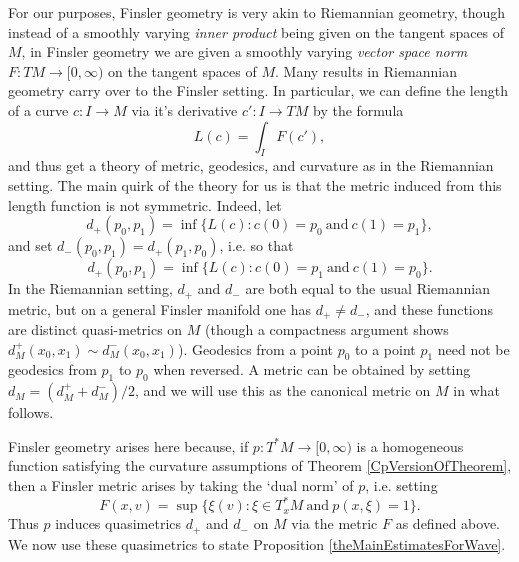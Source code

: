 For our purposes, Finsler geometry is very akin to Riemannian geometry, though instead of a smoothly varying \emph{inner product} being given on the tangent spaces of $M$, in Finsler geometry we are given a smoothly varying \emph{vector space norm} $F: TM \to [0,\infty)$ on the tangent spaces of $M$. Many results in Riemannian geometry carry over to the Finsler setting. In particular, we can define the length of a curve $c: I \to M$ via it's derivative $c': I \to TM$ by the formula
%
\begin{equation}
    L(c) = \int_I F(c'),
\end{equation}
%
and thus get a theory of metric, geodesics, and curvature as in the Riemannian setting. The main quirk of the theory for us is that the metric induced from this length function is not symmetric. Indeed, let
%
\begin{equation}
    d_+(p_0,p_1) = \inf \big\{ L(c) : c(0) = p_0\ \text{and}\ c(1) = p_1 \big\},
\end{equation}
%
and set $d_-(p_0,p_1) = d_+(p_1,p_0)$, i.e. so that
%
\begin{equation}
    d_+(p_0,p_1) = \inf \big\{ L(c) : c(0) = p_1\ \text{and}\ c(1) = p_0 \big\}.
\end{equation}
%
In the Riemannian setting, $d_+$ and $d_-$ are both equal to the usual Riemannian metric, but on a general Finsler manifold one has $d_+ \neq d_-$, and these functions are distinct quasi-metrics on $M$ (though a compactness argument shows $d_M^+(x_0,x_1) \sim d_M^-(x_0,x_1)$). Geodesics from a point $p_0$ to a point $p_1$ need not be geodesics from $p_1$ to $p_0$ when reversed. A metric can be obtained by setting $d_M = (d_M^+ + d_M^-) / 2$, and we will use this as the canonical metric on $M$ in what follows.

Finsler geometry arises here because, if $p: T^* M \to [0,\infty)$ is a homogeneous function satisfying the curvature assumptions of Theorem \ref{CpVersionOfTheorem}, then a Finsler metric arises by taking the `dual norm' of $p$, i.e. setting
%
\begin{equation}
    F(x,v) = \sup \big\{ \xi(v) : \xi \in T^*_x M\ \text{and}\ p(x,\xi) = 1 \big\}.
\end{equation}
%
Thus $p$ induces quasimetrics $d_+$ and $d_-$ on $M$ via the metric $F$ as defined above. We now use these quasimetrics to state Proposition \ref{theMainEstimatesForWave}.

